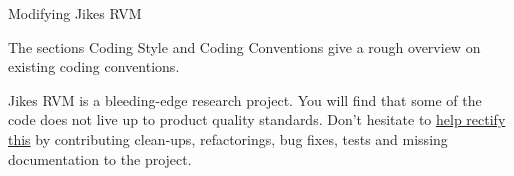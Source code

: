 \begin{section}{Modifying Jikes RVM}
\label{sec:modifyingjikesrvm}

The sections Coding Style and Coding Conventions give a rough overview on existing coding conventions.

Jikes RVM is a bleeding-edge research project. You will find that some of the code does not live up to product quality standards. Don't hesitate to \href{http://www.jikesrvm.org/HowToHelp/}{help rectify this} by contributing clean-ups, refactorings, bug fixes, tests and missing documentation to the project.

\end{section}
